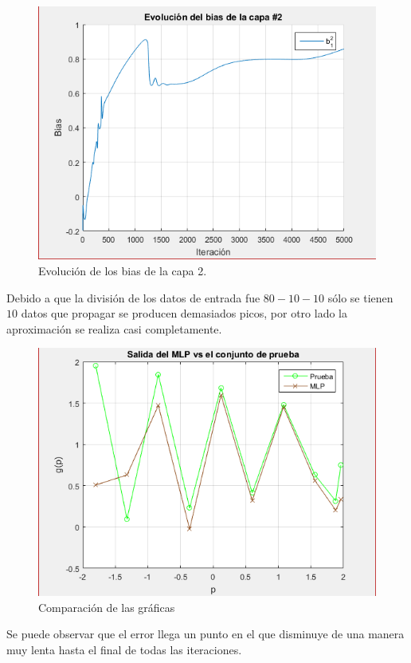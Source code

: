 \begin{figure}[H]
    \begin{center}
        \includegraphics[width=12cm]{1/bias2.png}
        \caption{Evolución de los bias de la capa 2.}
        \label{fig:bias2}
    \end{center}
\end{figure}
Debido a que la división de los datos de entrada fue $80-10-10$ sólo se tienen $10$ datos que propagar se producen demasiados picos, por otro lado la aproximación se realiza casi completamente.
\begin{figure}[H]
    \begin{center}
        \includegraphics[width=12cm]{1/prueba.png}
        \caption{Comparación de las gráficas}
        \label{fig:prueba1}
    \end{center}
\end{figure}
Se puede observar que el error llega un punto en el que disminuye de una manera muy lenta hasta el final de todas las iteraciones.
